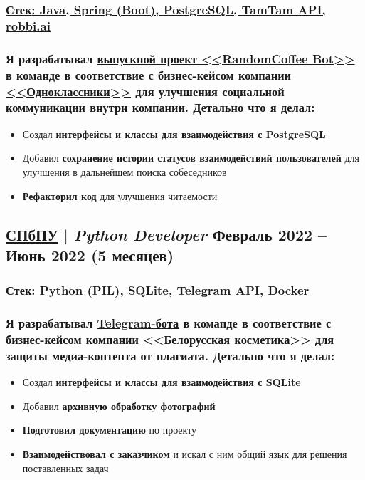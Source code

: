 \documentclass[11pt]{article}
\begin{document}
\subsubsection{\underline{\textbf{Стек}: Java, Spring (Boot), PostgreSQL, TamTam API, \href{https://robbi.ai/}{robbi.ai}}}
\subsubsection{Я разрабатывал \href{https://github.com/Sanerins/tamtam-one-coffee-bot}{\underline{выпускной проект <<RandomCoffee Bot>>}} в команде в соответствие с бизнес-кейсом компании \href{https://ok.ru/}{\underline{<<Одноклассники>>}} для улучшения социальной коммуникации внутри компании. Детально что я делал:}
\begin{itemize}
    \item Создал \textbf{интерфейсы и классы для взаимодействия с PostgreSQL}
    \item Добавил \textbf{сохранение истории статусов взаимодействий пользователей} для улучшения в дальнейшем поиска собеседников
    \item \textbf{Рефакторил код} для улучшения читаемости
\end{itemize}

\subsection{\href{https://www.spbstu.ru/}{\underline{СПбПУ}} $|$ {\normalfont\textit{Python Developer}} \hfill Февраль 2022 -- Июнь 2022 (5 месяцев)}
\subsubsection{\underline{\textbf{Стек}: Python (PIL), SQLite,  \href{https://github.com/python-telegram-bot/python-telegram-bot}{Telegram API}, Docker}}
\subsubsection{Я разрабатывал \href{https://github.com/PaaavelZ/FPA-pybot}{\underline{Telegram-бота}} в команде в соответствие с бизнес-кейсом компании \href{https://www.wbc-c.ru/}{\underline{<<Белорусская косметика>>}} для защиты медиа-контента от плагиата. Детально что я делал:}
\begin{itemize}
    \item Создал \textbf{интерфейсы и классы для взаимодействия с SQLite}
    \item Добавил \textbf{архивную обработку фотографий}
    \item \textbf{Подготовил документацию} по проекту
    \item \textbf{Взаимодействовал с заказчиком} и искал с ним общий язык для решения поставленных задач
\end{itemize}
\end{document}
